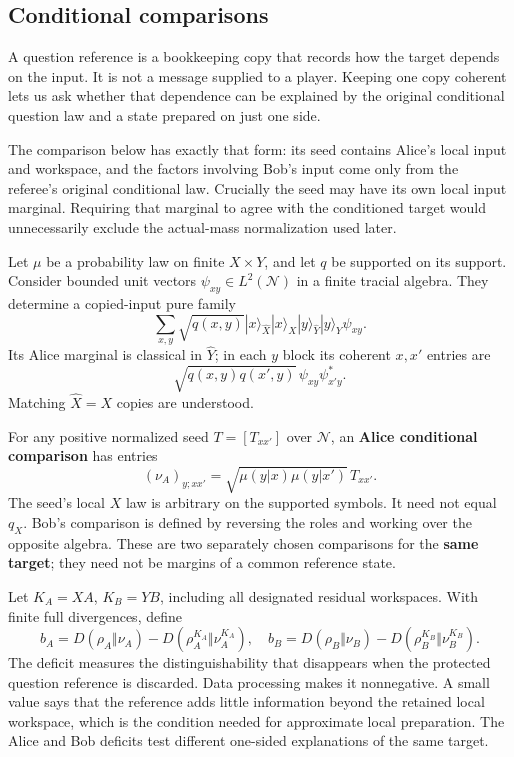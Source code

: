 \documentclass[11pt,reqno]{amsart}
\numberwithin{equation}{section}
\begin{document}
\subsection{Conditional comparisons}\label{conditional-comparisons}

A question reference is a bookkeeping copy that records how the target depends on the input. It is not a message supplied to a player. Keeping one copy coherent lets us ask whether that dependence can be explained by the original conditional question law and a state prepared on just one side.

The comparison below has exactly that form: its seed contains Alice's local input and workspace, and the factors involving Bob's input come only from the referee's original conditional law. Crucially the seed may have its own local input marginal. Requiring that marginal to agree with the conditioned target would unnecessarily exclude the actual-mass normalization used later.

Let \(\mu\) be a probability law on finite \(X\times Y\), and let \(q\) be supported on its support. Consider bounded unit vectors \(\psi_{xy}\in L^2(\mathcal N)\) in a finite tracial algebra. They determine a copied-input pure family \[
 \sum_{x,y}\sqrt{q(x,y)}
 |x\rangle_{\widehat X}|x\rangle_X
 |y\rangle_{\widehat Y}|y\rangle_Y\psi_{xy}. \tag{3.1}
\] Its Alice marginal is classical in \(\widehat Y\); in each \(y\) block its coherent \(x,x'\) entries are \[
 \sqrt{q(x,y)q(x',y)}\,\psi_{xy}\psi_{x'y}^*.
\] Matching \(\widehat X=X\) copies are understood.

For any positive normalized seed \(T=[T_{xx'}]\) over \(\mathcal N\), an \textbf{Alice conditional comparison} has entries \[
 (\nu_A)_{y;xx'}
 =\sqrt{\mu(y|x)\mu(y|x')}\,T_{xx'}. \tag{3.2}
\] The seed's local \(X\) law is arbitrary on the supported symbols. It need not equal \(q_X\). Bob's comparison is defined by reversing the roles and working over the opposite algebra. These are two separately chosen comparisons for the \textbf{same target}; they need not be margins of a common reference state.

Let \(K_A=XA\), \(K_B=YB\), including all designated residual workspaces. With finite full divergences, define \[
 b_A=D(\rho_A\Vert\nu_A)
       -D(\rho_A^{K_A}\Vert\nu_A^{K_A}),\quad
 b_B=D(\rho_B\Vert\nu_B)
       -D(\rho_B^{K_B}\Vert\nu_B^{K_B}). \tag{3.3}
\] The deficit measures the distinguishability that disappears when the protected question reference is discarded. Data processing makes it nonnegative. A small value says that the reference adds little information beyond the retained local workspace, which is the condition needed for approximate local preparation. The Alice and Bob deficits test different one-sided explanations of the same target.
\end{document}
